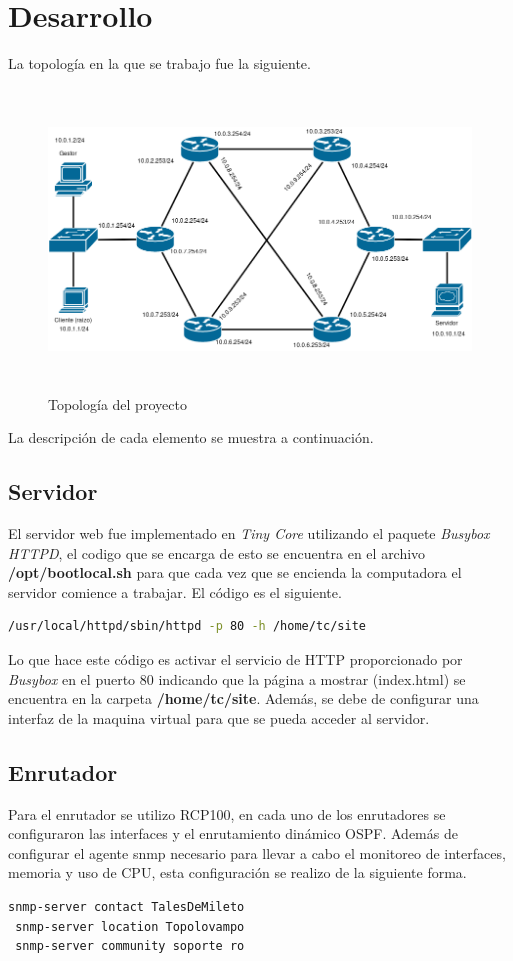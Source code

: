 \documentclass[12pt, titlepage]{article}
\begin{document}
\section{Desarrollo}
La topología en la que se trabajo fue la siguiente.
\begin{figure}[H]
\begin{center}
 \includegraphics[width=15cm, height=8cm]{./entrega.png}
 \caption{Topología del proyecto}
 \label{fig:3318-paridad}
\end{center}
\end{figure}
La descripción de cada elemento se muestra a continuación.
\subsection{Servidor}
El servidor web fue implementado en \emph{Tiny Core} utilizando el paquete \emph{Busybox HTTPD}, el codigo que se encarga de esto se encuentra en el archivo \textbf{/opt/bootlocal.sh} para que cada vez que se encienda la computadora el servidor comience a trabajar. El código es el siguiente.

\begin{lstlisting}[language=bash]
 /usr/local/httpd/sbin/httpd -p 80 -h /home/tc/site
\end{lstlisting}
Lo que hace este código es activar el servicio de HTTP proporcionado por \emph{Busybox} en el puerto 80 indicando que la página a mostrar (index.html) se encuentra en la carpeta \textbf{/home/tc/site}.
Además, se debe de configurar una interfaz de la maquina virtual para que se pueda acceder al servidor.
\subsection{Enrutador}
Para el enrutador se utilizo RCP100, en cada uno de los enrutadores se configuraron las interfaces y el enrutamiento dinámico OSPF. Además de configurar el agente snmp necesario para llevar a cabo el monitoreo de interfaces, memoria y uso de CPU, esta configuración se realizo de la siguiente forma.
\begin{lstlisting}[language=bash]
 snmp-server contact TalesDeMileto
 snmp-server location Topolovampo
 snmp-server community soporte ro
\end{lstlisting}
\end{document}
